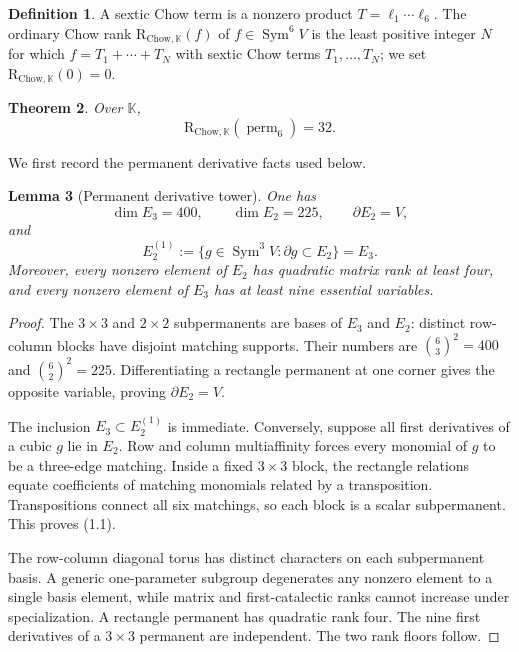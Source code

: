 \documentclass[11pt]{amsart}
\newcommand{\K}{\mathbb{K}}
\newcommand{\Sym}{\operatorname{Sym}}
\newcommand{\perm}{\operatorname{perm}}
\newcommand{\CR}{\mathrm{R}_{\mathrm{Chow},\K}}
\newtheorem{theorem}{Theorem}[section]
\newtheorem{lemma}[theorem]{Lemma}
\theoremstyle{definition}
\newtheorem{definition}[theorem]{Definition}
\begin{document}
\begin{definition}
A sextic Chow term is a nonzero product \(T=\ell_1\cdots\ell_6\). The
ordinary Chow rank \(\CR(f)\) of \(f\in\Sym^6V\) is the least positive
integer \(N\) for which \(f=T_1+\cdots+T_N\) with sextic Chow terms
\(T_1,\ldots,T_N\); we set \(\CR(0)=0\).
\end{definition}

\begin{theorem}\label{thm:main}
Over \(\K\),
\[
 \boxed{\CR(\perm_6)=32.}
\]
\end{theorem}

We first record the permanent derivative facts used below.

\begin{lemma}[Permanent derivative tower]\label{lem:tower}
One has
\[
 \dim E_3=400,\qquad \dim E_2=225,\qquad
 \partial E_2=V,
\]
and
\[
 E_2^{(1)}:=\{g\in\Sym^3V:\partial g\subset E_2\}=E_3. \tag{1.1}
\]
Moreover, every nonzero element of \(E_2\) has quadratic matrix rank at
least four, and every nonzero element of \(E_3\) has at least nine essential
variables.
\end{lemma}

\begin{proof}
The \(3\times3\) and \(2\times2\) subpermanents are bases of \(E_3\) and
\(E_2\): distinct row-column blocks have disjoint matching supports. Their
numbers are \(\binom63^2=400\) and \(\binom62^2=225\). Differentiating a
rectangle permanent at one corner gives the opposite variable, proving
\(\partial E_2=V\).

The inclusion \(E_3\subset E_2^{(1)}\) is immediate. Conversely, suppose
all first derivatives of a cubic \(g\) lie in \(E_2\). Row and column
multiaffinity forces every monomial of \(g\) to be a three-edge matching.
Inside a fixed \(3\times3\) block, the rectangle relations equate
coefficients of matching monomials related by a transposition. Transpositions
connect all six matchings, so each block is a scalar subpermanent. This proves
(1.1).

The row-column diagonal torus has distinct characters on each subpermanent
basis. A generic one-parameter subgroup degenerates any nonzero element to a
single basis element, while matrix and first-catalectic ranks cannot increase
under specialization. A rectangle permanent has quadratic rank four. The
nine first derivatives of a \(3\times3\) permanent are independent. The two
rank floors follow.
\end{proof}
\end{document}

